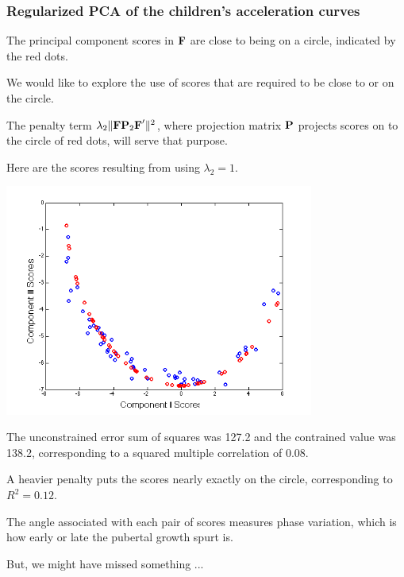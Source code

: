 \documentclass[11pt]{beamer}
\begin{document}
\begin{frame}

\frametitle{Regularized PCA of the children's acceleration curves}

\bi
  \item The principal component scores in $\mbox{\bf F}$ are close to being on a circle,
  indicated by the red dots.
  \item We would like to explore the use of scores that are required to be close to or on the circle.
  \item The penalty term $\lambda_2 \| \mbox{\bf F}  \mbox{\bf P}_2 \mbox{\bf F}' \|^2$, where projection matrix $\mbox{\bf P}$ projects scores on to the circle of red dots, will serve that purpose.
  \item Here are the scores resulting from using $\lambda_2 = 1$.
\ei

\end{frame}


\begin{frame}

\begin{center}
\includegraphics[width=4in]{figs/GrowthScore_1.png}
\end{center}

\end{frame}


\begin{frame}

\bi
  \item The unconstrained error sum of squares was 127.2 and the contrained value was 138.2,
  corresponding to a squared multiple correlation of 0.08.  
  \item A heavier penalty puts the scores nearly exactly on the circle, corresponding to $R^2 = 0.12.$
  \item The angle associated with each pair of scores measures phase variation, which is how early or late the pubertal growth spurt is.
  \item But, we might have missed something ...
\ei

\end{frame}
\end{document}
